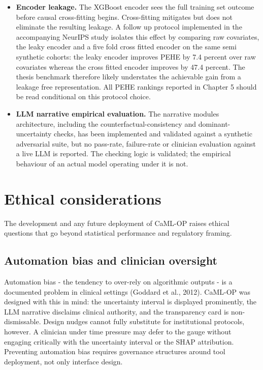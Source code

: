 \begin{itemize}
\item
 \textbf{Encoder leakage.} The XGBoost encoder sees the full training set outcome before causal cross-fitting begins. Cross-fitting mitigates but does not eliminate the resulting leakage. A follow up protocol implemented in the accompanying NeurIPS study isolates this effect by comparing raw covariates, the leaky encoder and a five fold cross fitted encoder on the same semi synthetic cohorts: the leaky encoder improves PEHE by 7.4 percent over raw covariates whereas the cross fitted encoder improves by 47.4 percent. The thesis benchmark therefore likely understates the achievable gain from a leakage free representation. All PEHE rankings reported in Chapter 5 should be read conditional on this protocol choice.
\item
 \textbf{LLM narrative empirical evaluation.} The narrative module\textquotesingle s architecture, including the counterfactual-consistency and dominant-uncertainty checks, has been implemented and validated against a synthetic adversarial suite, but no pass-rate, failure-rate or clinician evaluation against a live LLM is reported. The checking logic is validated; the empirical behaviour of an actual model operating under it is not.
\end{itemize}

\section{Ethical considerations}\label{ethical-considerations}

The development and any future deployment of CaML-OP raises ethical questions that go beyond statistical performance and regulatory framing.

\subsection{Automation bias and clinician oversight}\label{automation-bias-and-clinician-oversight}

Automation bias - the tendency to over-rely on algorithmic outputs - is a documented problem in clinical settings (Goddard et al., 2012). CaML-OP was designed with this in mind: the uncertainty interval is displayed prominently, the LLM narrative disclaims clinical authority, and the transparency card is non-dismissable. Design nudges cannot fully substitute for institutional protocols, however. A clinician under time pressure may defer to the gauge without engaging critically with the uncertainty interval or the SHAP attribution. Preventing automation bias requires governance structures around tool deployment, not only interface design.

